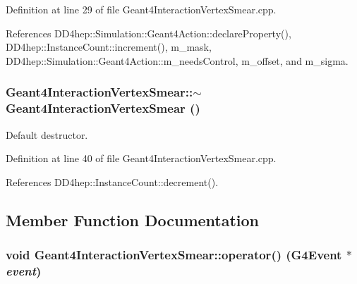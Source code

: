 Definition at line 29 of file Geant4InteractionVertexSmear.cpp.

References DD4hep::Simulation::Geant4Action::declareProperty(), DD4hep::InstanceCount::increment(), m\_\-mask, DD4hep::Simulation::Geant4Action::m\_\-needsControl, m\_\-offset, and m\_\-sigma.\hypertarget{class_d_d4hep_1_1_simulation_1_1_geant4_interaction_vertex_smear_aca69c6fbcb40dc0bcb6cd044906e5028}{
\subsubsection[{$\sim$Geant4InteractionVertexSmear}]{\setlength{\rightskip}{0pt plus 5cm}Geant4InteractionVertexSmear::$\sim$Geant4InteractionVertexSmear ()}}
\label{class_d_d4hep_1_1_simulation_1_1_geant4_interaction_vertex_smear_aca69c6fbcb40dc0bcb6cd044906e5028}


Default destructor. 

Definition at line 40 of file Geant4InteractionVertexSmear.cpp.

References DD4hep::InstanceCount::decrement().

\subsection{Member Function Documentation}
\hypertarget{class_d_d4hep_1_1_simulation_1_1_geant4_interaction_vertex_smear_ada2914ca2a761ff0e1ccbbcc8bef578e}{
\subsubsection[{operator()}]{\setlength{\rightskip}{0pt plus 5cm}void Geant4InteractionVertexSmear::operator() (G4Event $\ast$ {\em event})}}
\label{class_d_d4hep_1_1_simulation_1_1_geant4_interaction_vertex_smear_ada2914ca2a761ff0e1ccbbcc8bef578e}


